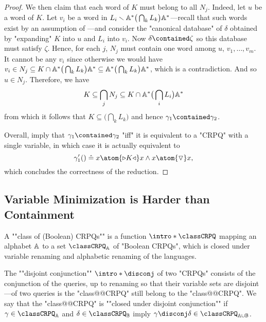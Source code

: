 \begin{proof}
	We then claim that each word of $K$ must belong to all $N_j$.
	Indeed, let $u$ be a word of $K$. Let $v_i$ be a word in
	$L_i \smallsetminus \mathbb{A}^* \big(\bigcap_k L_k\big) \mathbb{A}^*$---recall
	that such words exist by an assumption of ---and
	consider the "canonical database" of $\delta$ obtained by "expanding"
	$K$ into $u$ and $L_i$ into $v_i$.
	Now $\delta \contained \zeta$ so this database must satisfy $\zeta$.
	Hence, for each $j$, $N_j$ must contain one word among $u$, $v_1, \hdots,v_m$.
	It cannot be any $v_i$ since otherwise we would have $v_i \in N_j \subseteq
	K \cap \mathbb{A}^* \big(\bigcap_k L_k\big) \mathbb{A}^* \subseteq \mathbb{A}^* \big(\bigcap_k L_k\big) \mathbb{A}^*$, which is a contradiction. And so $u \in N_j$.
	Therefore, we have
	\[
		K \subseteq \bigcap_j N_j \subseteq K \cap \mathbb{A}^* \big(\bigcap_i L_i\big) \mathbb{A}^*
	\]
	from which it follows that $K \subseteq \big(\bigcap_k L_k\big)$ and hence
	$\gamma_1 \contained \gamma_2$.
	
	Overall,
	imply that $\gamma_1 \contained \gamma_2$ "iff" it is equivalent
	to a "CRPQ" with a single variable, in which case it is actually equivalent to
	\[\gamma'_1() \defeq x \atom{\triangleright K \triangleleft} x
		\land x \atom{\marking} x,\]
	which concludes the correctness of the reduction.
\end{proof}

\subsection{Variable Minimization is Harder than Containment}

A \AP""class of (Boolean) CRPQs"" is a function \AP$\intro*\classCRPQ$ mapping an alphabet $\mathbb{A}$ 
to a set $\classCRPQ_{\A}$ of "Boolean CRPQs", which is closed under variable renaming and alphabetic
renaming of the languages.

The \AP""disjoint conjunction"" \AP$\intro*\disconj$ of two "CRPQs" consists of
the conjunction of the queries, up to renaming so that their variable sets are disjoint---of two queries is 
the "class@@CRPQ" still belong to the "class@@CRPQ".
We say that the "class@@CRPQ" is \AP""closed under disjoint conjunction""
if $\gamma \in \classCRPQ_\A$ and $\delta \in \classCRPQ_\B$
imply $\gamma \disconj \delta \in \classCRPQ_{\A \cup \B}$.

